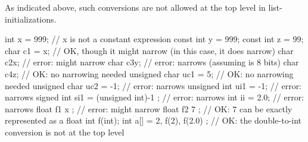 \begin{note} As indicated above, such conversions are not allowed at the top level in
list-initializations.\end{note} \begin{example}

\begin{codeblock}
int x = 999;              // x is not a constant expression
const int y = 999;
const int z = 99;
char c1 = x;              // OK, though it might narrow (in this case, it does narrow)
char c2{x};               // error: might narrow
char c3{y};               // error: narrows (assuming  is 8 bits)
char c4{z};               // OK: no narrowing needed
unsigned char uc1 = {5};  // OK: no narrowing needed
unsigned char uc2 = {-1}; // error: narrows
unsigned int ui1 = {-1};  // error: narrows
signed int si1 =
  { (unsigned int)-1 };   // error: narrows
int ii = {2.0};           // error: narrows
float f1 { x };           // error: might narrow
float f2 { 7 };           // OK: 7 can be exactly represented as a float
int f(int);
int a[] =
  { 2, f(2), f(2.0) };    // OK: the double-to-int conversion is not at the top level
\end{codeblock}
\end{example}%
%
%

